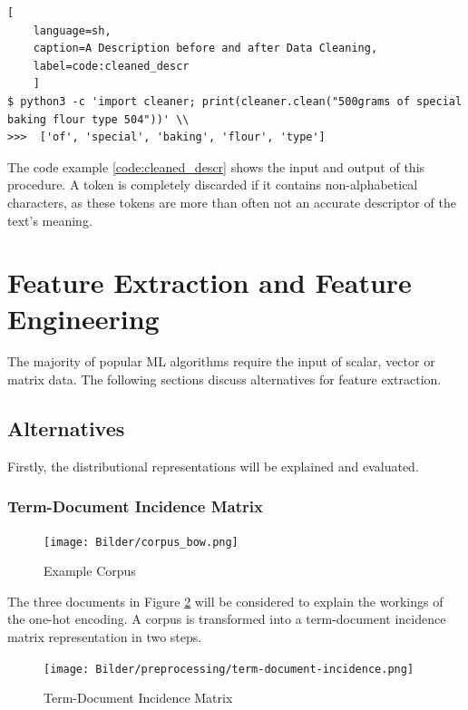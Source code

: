 \begin{lstlisting}[
	language=sh,
	caption=A Description before and after Data Cleaning,
	label=code:cleaned_descr
	]
$ python3 -c 'import cleaner; print(cleaner.clean("500grams of special baking flour type 504"))' \\
>>>  ['of', 'special', 'baking', 'flour', 'type']
\end{lstlisting}
	 
	 The code example \ref{code:cleaned_descr} shows the input and output of this procedure. A token is completely discarded if it contains non-alphabetical characters, as these tokens are more than often not an accurate descriptor of the text's meaning.	

        
        \section{Feature Extraction and Feature Engineering}
        \label{section:feature-extraction}
        The majority of popular \ac{ML} algorithms require the input of scalar, vector or matrix data. The following sections discuss alternatives for feature extraction.
            \subsection{Alternatives}
            Firstly, the distributional representations will be explained and evaluated.
            
            \subsubsection{Term-Document Incidence Matrix}
			\label{section:tdim}
            \begin{figure}[h]
            	\centering
            	 \texttt{[image: Bilder/corpus\_bow.png]}
            	\caption{Example Corpus}
            	\label{fig:term-doc-incidence}
            \end{figure}
            The three documents in Figure \ref{fig:corpus} will be considered to explain the workings of the one-hot encoding. A corpus is transformed into a term-document incidence matrix representation in two steps. 
            
            \begin{figure}[h!]
            	\centering
            	\texttt{[image: Bilder/preprocessing/term-document-incidence.png]}
            	\caption{Term-Document Incidence Matrix}
            	\label{fig:corpus}
            \end{figure}
            
